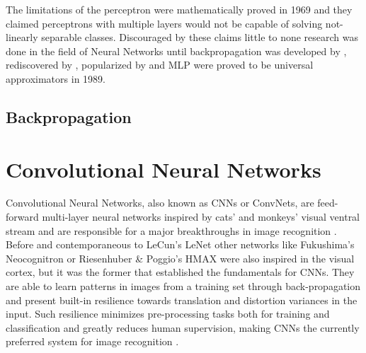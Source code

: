 The limitations of the perceptron were mathematically proved \citet{Minsky1969} in 1969 and they claimed perceptrons with multiple layers would not be capable of solving not-linearly separable classes.
Discouraged by these claims little to none research was done in the field of Neural Networks until backpropagation was developed by \citet{Werbos1974}, rediscovered by \citet{Parker1985}, popularized by \citet{Rumelhart1988} and MLP were proved to be universal approximators \cite{Hornik1989,Ruck1990} in 1989.


\subsection{Backpropagation}
\label{sec:theory:mlp:backpropagation}
\todo[inline]



\section{Convolutional Neural Networks}
\label{sec:theory:convnets}
Convolutional Neural Networks, also known as CNNs or ConvNets, are feed-forward multi-layer neural networks inspired by cats' and monkeys' visual ventral stream \cite{Hubel1968,Lawrence1997} and are responsible for a major breakthroughs in image recognition \cite{LeCun1995}.
Before and contemporaneous to LeCun's LeNet \cite{LeCun1998} other networks like Fukushima's Neocognitron \cite{Fukushima1980} or Riesenhuber \& Poggio's HMAX \cite{Riesenhuber1999} were also inspired in the visual cortex, but it was the former that established the fundamentals for CNNs.
They are able to learn patterns in images from a training set through back-propagation and present built-in resilience towards translation and distortion variances in the input.
Such resilience minimizes pre-processing tasks both for training and classification and greatly reduces human supervision, making CNNs the currently preferred system for image recognition \cite{Visin2015}.

